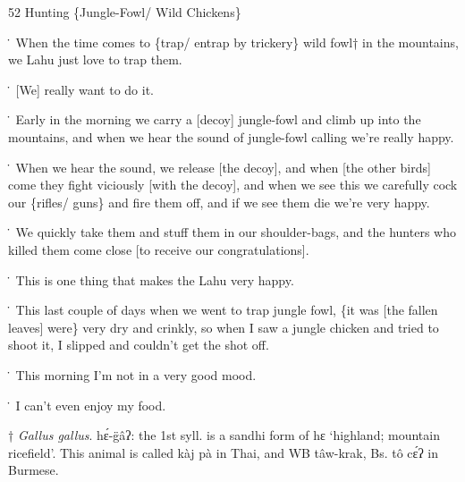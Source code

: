 
52 Hunting \{Jungle-Fowl/ Wild Chickens\}

\. When the time comes to \{trap/ entrap by trickery\} wild fowl† in the mountains,
we Lahu just love to trap them.

\. [We] really want to do it.

\. Early in the morning we carry a [decoy] jungle-fowl and climb up into the mountains,
and when we hear the sound of jungle-fowl calling we're really happy.

\. When we hear the sound, we release [the decoy], and when [the other birds] come
they fight viciously [with the decoy], and when we see this we carefully cock our
\{rifles/ guns\} and fire them off, and if we see them die we're very happy.

\. We quickly take them and stuff them in our shoulder-bags, and the hunters who
killed them come close [to receive our congratulations].

\. This is one thing that makes the Lahu very happy.

\. This last couple of days when we went to trap jungle fowl, \{it was [the fallen
leaves] were\} very dry and crinkly, so when I saw a jungle chicken and tried to
shoot it, I slipped and couldn't get the shot off.

\. This morning I'm not in a very good mood.

\. I can't even enjoy my food.

† \textit{Gallus gallus}. hɛ́-g̈âʔ: the 1st syll. is a sandhi form of hɛ
`highland; mountain ricefield'.  This animal is called kàj pà in Thai, and WB
tâw-krak, Bs. tô cɛ́ʔ in Burmese.


